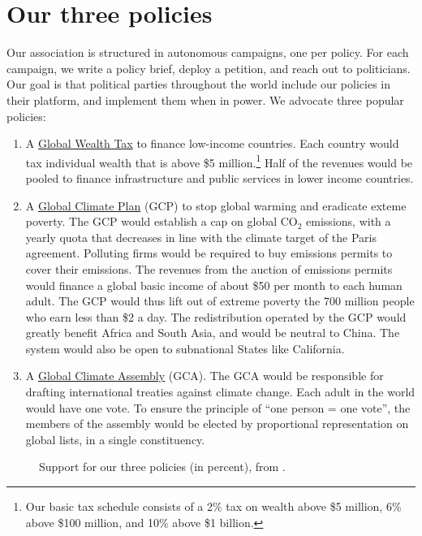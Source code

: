 \documentclass[12pt,english]{article}
\begin{document}
\section{Our three policies}

Our association is structured in autonomous campaigns, one per policy. For each campaign, we write a policy brief, deploy a petition, and reach out to politicians. Our goal is that political parties throughout the world include our policies in their platform, and implement them when in power. We advocate three popular policies:
\begin{enumerate}
  \item A \href{https://github.com/bixiou/global_tax_attitudes/raw/main/paper/policy_brief_tax.pdf}{Global Wealth Tax} to finance low-income countries. Each country would tax individual wealth that is above \$5 million.\footnote{Our basic tax schedule consists of a 2\% tax on wealth above \$5 million, 6\% above \$100 million, and 10\% above \$1 billion.} 
  Half of the revenues would be pooled to finance infrastructure and public services in lower income countries. 
  \item A \href{https://github.com/bixiou/global_tax_attitudes/raw/main/paper/policy_brief_GCP.pdf}{Global Climate Plan} (GCP) to stop global warming and eradicate exteme poverty. The GCP would establish a cap on global CO$_\text{2}$ emissions, with a yearly quota that decreases in line with the climate target of the Paris agreement. Polluting firms would be required to buy emissions permits to cover their emissions. The revenues from the auction of emissions permits would finance a global basic income of about \$50 per month to each human adult. The GCP would thus lift out of extreme poverty the 700 million people who earn less than \$2 a day. The redistribution operated by the GCP would greatly benefit Africa and South Asia, and would be neutral to China. The system would also be open to subnational States like California. 
  \item A \href{https://github.com/bixiou/global_tax_attitudes/raw/main/paper/policy_brief_assembly.pdf}{Global Climate Assembly} (GCA). The GCA would be responsible for drafting international treaties against climate change. Each adult in the world would have one vote. To ensure the principle of ``one person = one vote'', the members of the assembly would be elected by proportional representation on global lists, in a single constituency.
\end{enumerate}

\begin{figure}[h!]
  \caption{Support for our three policies (in percent), from \citet{fabre_international_2023}.}\label{fig:GDPpc}
\end{figure}
\end{document}
